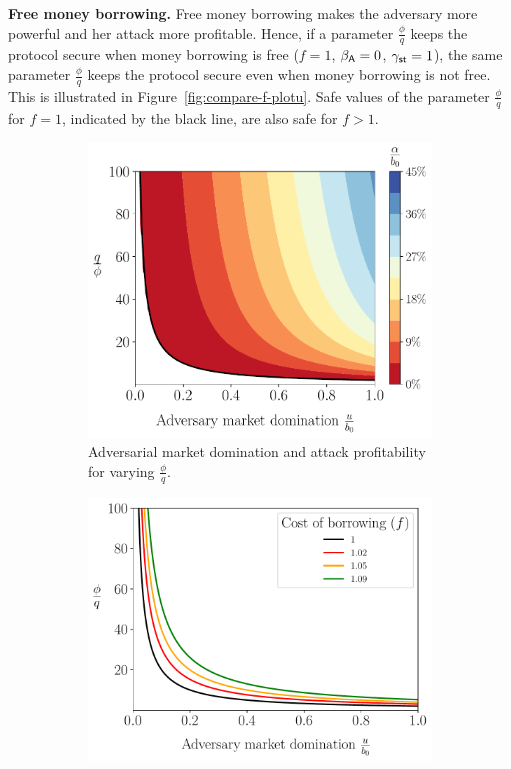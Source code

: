 \noindent
\textbf{Free money borrowing.}
Free money borrowing makes the adversary more powerful and her attack
more profitable.
Hence, if a parameter $\frac{\phi}{q}$ keeps the protocol secure when money
borrowing is free ($f = 1$, $\beta_{\textsf{A}} = 0$, $\gamma_{\textsf{st}} = 1$),
the same parameter $\frac{\phi}{q}$ keeps the protocol secure even when
money borrowing is not free. This is illustrated in
Figure~\ref{fig:compare-f-plotu}. Safe values of the parameter $\frac{\phi}{q}$
for $f = 1$, indicated by the black line, are also safe for $f > 1$.


\begin{figure}[htb]
  \centering
  \begin{subfigure}{0.49\textwidth}
    \centering
    \includegraphics[width=\textwidth]{./plots/plotu.pdf}
    \caption{Adversarial market domination and attack profitability
             for varying $\frac{\phi}{q}$.}
    \label{fig:contour-plotu}
  \end{subfigure}
  \hfill
  \begin{subfigure}{0.49\textwidth}
    \centering
    \includegraphics[width=\textwidth]{./plots/multiplef_plotu.pdf}

\end{subfigure}
\end{figure}
